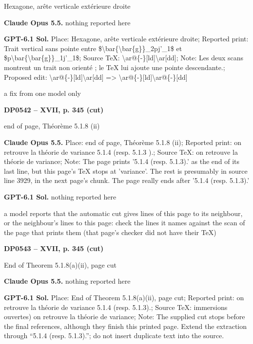 Hexagone, arête verticale extérieure droite\par
\textbf{Claude Opus 5.5.} nothing reported here\par
\textbf{GPT-6.1 Sol.} Place: Hexagone, arête verticale extérieure droite; Reported print: Trait vertical sans pointe entre \$\textbackslash{}bar\{\textbackslash{}bar\{g\}\}\_2pj'\_1\$ et \$p\textbackslash{}bar\{\textbackslash{}bar\{g\}\}\_1j'\_1\$; Source TeX: \textbackslash{}ar@\{-\}[ld]\textbackslash{}ar[dd]; Note: Les deux scans montrent un trait non orienté ; le TeX lui ajoute une pointe descendante.; Proposed edit: \textbackslash{}ar@\{-\}[ld]\textbackslash{}ar[dd] =\allowbreak > \textbackslash{}ar@\{-\}[ld]\textbackslash{}ar@\{-\}[dd]\par
a fix from one model only\par
\par\noindent\hypertarget{DP0542}{}\textbf{DP0542 -- XVII, p. 345 (cut)}\par
end of page, Théorème 5.1.8 (ii)\par
\textbf{Claude Opus 5.5.} Place: end of page, Théorème 5.1.8 (ii); Reported print: on retrouve la théorie de variance 5.1.4 (resp. 5.1.3 ).; Source TeX: on retrouve la théorie de variance; Note: The page prints '5.1.4 (resp. 5.1.3).' as the end of its last line, but this page's TeX stops at 'variance'. The rest is presumably in source line 3929, in the next page's chunk. The page really ends after '5.1.4 (resp. 5.1.3).'\par
\textbf{GPT-6.1 Sol.} nothing reported here\par
a model reports that the automatic cut gives lines of this page to its neighbour, or the neighbour's lines to this page: check the lines it names against the scan of the page that prints them (that page's checker did not have their TeX)\par
\par\noindent\hypertarget{DP0543}{}\textbf{DP0543 -- XVII, p. 345 (cut)}\par
End of Theorem 5.1.8(a)(ii), page cut\par
\textbf{Claude Opus 5.5.} nothing reported here\par
\textbf{GPT-6.1 Sol.} Place: End of Theorem 5.1.8(a)(ii), page cut; Reported print: on retrouve la théorie de variance 5.1.4 (resp. 5.1.3).; Source TeX: immersions ouvertes) on retrouve la théorie de variance; Note: The supplied cut stops before the final references, although they finish this printed page. Extend the extraction through “5.1.4 (resp. 5.1.3).”; do not insert duplicate text into the source.\par
